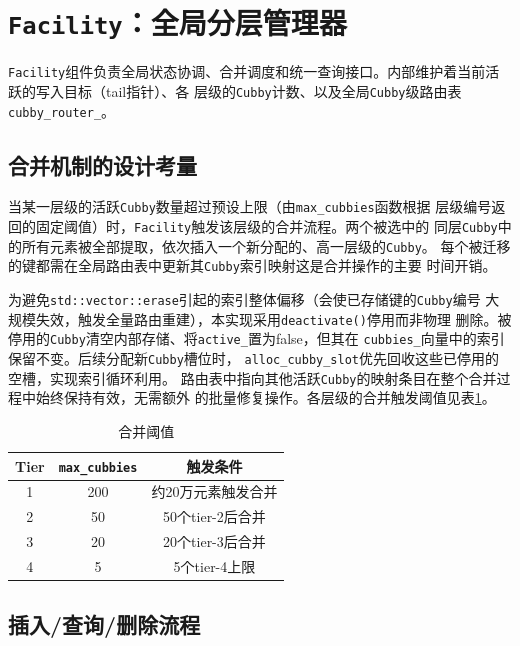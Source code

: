 \documentclass[
    type = bachelor,
    fontset = win,
    decl-page = true,
  ]{njuthesis}
\begin{document}
\section{\texttt{Facility}：全局分层管理器}

\texttt{Facility}组件负责全局状态协调、合并调度和统一查询接口\cite{1}。内部维护着当前活跃的写入目标（tail指针）、各
层级的\texttt{Cubby}计数、以及全局\texttt{Cubby}级路由表\texttt{cubby\_router\_}。

\subsection{合并机制的设计考量}

当某一层级的活跃\texttt{Cubby}数量超过预设上限（由\texttt{max\_cubbies}函数根据
层级编号返回的固定阈值）时，\texttt{Facility}触发该层级的合并流程。两个被选中的
同层\texttt{Cubby}中的所有元素被全部提取，依次插入一个新分配的、高一层级的\texttt{Cubby}。
每个被迁移的键都需在全局路由表中更新其\texttt{Cubby}索引映射这是合并操作的主要
时间开销。

为避免\texttt{std::vector::erase}引起的索引整体偏移（会使已存储键的\texttt{Cubby}编号
大规模失效，触发全量路由重建），本实现采用\texttt{deactivate()}停用而非物理
删除。被停用的\texttt{Cubby}清空内部存储、将\texttt{active\_}置为false，但其在
\texttt{cubbies\_}向量中的索引保留不变。后续分配新\texttt{Cubby}槽位时，
\texttt{alloc\_cubby\_slot}优先回收这些已停用的空槽，实现索引循环利用。
路由表中指向其他活跃\texttt{Cubby}的映射条目在整个合并过程中始终保持有效，无需额外
的批量修复操作。各层级的合并触发阈值见表\ref{tab:merge}。

\begin{table}[H]
\centering
\begin{tabular}{c|c|c}
\toprule
Tier & \texttt{max\_cubbies} & 触发条件 \\
\midrule
1 & 200 & 约20万元素触发合并 \\
2 & 50  & 50个tier-2后合并 \\
3 & 20  & 20个tier-3后合并 \\
4 & 5   & 5个tier-4上限 \\
\bottomrule
\end{tabular}
\caption{合并阈值}
\label{tab:merge}
\end{table}

\subsection{插入/查询/删除流程}
\end{document}
